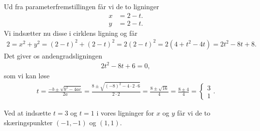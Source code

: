\begin{enumerate}
Ud fra parameterfremstillingen får vi de to ligninger
\begin{align*}
x &= 2 -t. \\
y &= 2 -t.
\end{align*}
Vi indsætter nu disse i cirklens ligning og får
\begin{align*}
2 = x^2+y^2 = (2-t)^2+(2-t)^2 = 2(2-t)^2 = 2( 4 +t^2 -4t) = 2t^2-8t+8.
\end{align*}
Det giver os andengradsligningen
\begin{align*}
2t^2-8t+6 = 0,
\end{align*}
som vi kan løse 
\begin{align*}
t = \frac{-b \pm \sqrt{b^2-4ac}}{2a} = \frac{8 \pm \sqrt{(-8)^2-4\cdot 2 \cdot 6}}{2 \cdot 2} = \frac{8 \pm \sqrt{16}}{4} = \frac{8 \pm 4}{4} = \begin{cases} 3 \\ 1 \end{cases}.
\end{align*}
\end{enumerate}
Ved at indsætte $t=3$ og $t=1$ i vores ligninger for $x$ og $y$ får vi de to skæringspunkter  $(-1,-1)$ og $(1,1)$.












